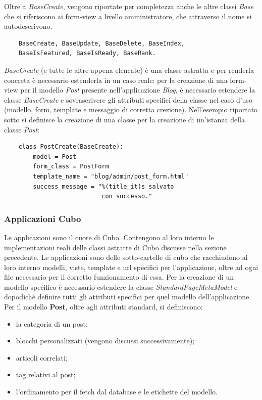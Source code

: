 \documentclass[12pt,a4paper]{article}
\begin{document}
Oltre a \textit{BaseCreate}, vengono riportate per completezza anche le altre classi \textit{Base} che si riferiscono ai form-view a livello amministratore, che attraverso il nome si autodescrivono.

\begin{verbatim}
    BaseCreate, BaseUpdate, BaseDelete, BaseIndex,
    BaseIsFeatured, BaseIsReady, BaseRank.
\end{verbatim}

\textit{BaseCreate} (e tutte le altre appena elencate) è una classe astratta e per renderla concreta è necessario estenderla in un caso reale: per la creazione di una form-view per il modello \textit{Post} presente nell'applicazione \textit{Blog}, è necessario estendere la classe \textit{BaseCreate} e sovrascrivere gli attributi specifici della classe nel caso d'uso (modello, form, template e messaggio di corretta crezione). Nell'esempio riportato sotto si definisce la creazione di una classe per la creazione di un'istanza della classe \textit{Post}:
\begin{verbatim}
    class PostCreate(BaseCreate):
        model = Post
        form_class = PostForm
        template_name = "blog/admin/post_form.html"
        success_message = "%(title_it)s salvato
                           con successo."
\end{verbatim}

\subsubsection{Applicazioni Cubo}
Le applicazioni sono il cuore di Cubo. Contengono al loro interno le implementazioni reali delle classi astratte di Cubo discusse nella sezione precedente. Le applicazioni sono delle sotto-cartelle di cubo che racchiudono al loro interno modelli, viste, template e url specifici per l'applicazione, oltre ad ogni file necessario per il corretto funzionamento di essa. Per la creazione di un modello specifico è necessario estendere la classe \textit{StandardPageMetaModel} e dopodichè definire tutti gli attributi specifici per quel modello dell'applicazione. Per il modello \textbf{Post}, oltre agli attributi standard, si definiscono:
\begin{itemize}
    \item la categoria di un post;
    \item blocchi personalizzati (vengono discussi successivamente);
    \item articoli correlati;
    \item tag relativi al post;
    \item l'ordinamento per il fetch dal database e le etichette del modello.
\end{itemize}
\end{document}
